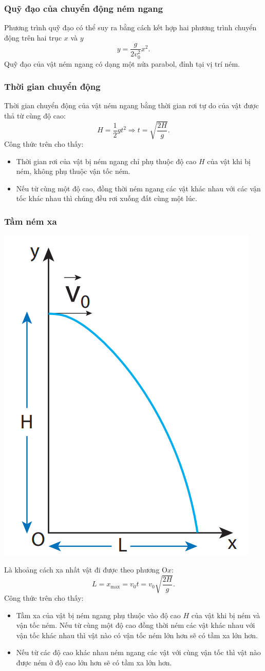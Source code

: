 \subsubsection{Quỹ đạo của chuyển động ném ngang}
Phương trình quỹ đạo có thể suy ra bằng cách kết hợp hai phương trình chuyển động trên hai trục $x$ và $y$ 
\begin{equation*}
	y=\dfrac{g}{2v_0^2}x^2.
\end{equation*}
Quỹ đạo của vật ném ngang có dạng một nửa parabol, đỉnh tại vị trí ném.

\subsubsection{Thời gian chuyển động}
Thời gian chuyển động của vật ném ngang bằng thời gian rơi tự do của vật được thả từ cùng độ cao:
\begin{equation*}
	H=\dfrac{1}{2}gt^2\Rightarrow t=\sqrt{\dfrac{2H}{g}}.
\end{equation*}
Công thức trên cho thấy:
\begin{itemize}
	\item Thời gian rơi của vật bị ném ngang chỉ phụ thuộc độ cao $H$ của vật khi bị ném, không phụ thuộc vận tốc ném.
	\item Nếu từ cùng một độ cao, đồng thời ném ngang các vật khác nhau với các vận tốc khác nhau thì chúng đều rơi xuống đất cùng một lúc.
\end{itemize}
\subsubsection{Tầm ném xa}
\begin{center}
	\includegraphics[width=0.2\linewidth]{../figs/VN10-2023-PH-TP012-3}
\end{center}
Là khoảng cách xa nhất vật đi được theo phương O$x$:
\begin{equation*}
	L = x_{\text{max}} = v_0 t = v_0 \sqrt{\dfrac{2H}{g}}.
\end{equation*}
Công thức trên cho thấy:
\begin{itemize}
	\item Tầm xa của vật bị ném ngang phụ thuộc vào độ cao $H$ của vật khi bị ném và vận tốc ném. Nếu từ cùng một độ cao đồng thời ném các vật khác nhau với vận tốc khác nhau thì vật nào có vận tốc ném lớn hơn sẽ có tầm xa lớn hơn.
	\item Nếu từ các độ cao khác nhau ném ngang các vật với cùng vận tốc thì vật nào được ném ở độ cao lớn hơn sẽ có tầm xa lớn hơn.
\end{itemize}
